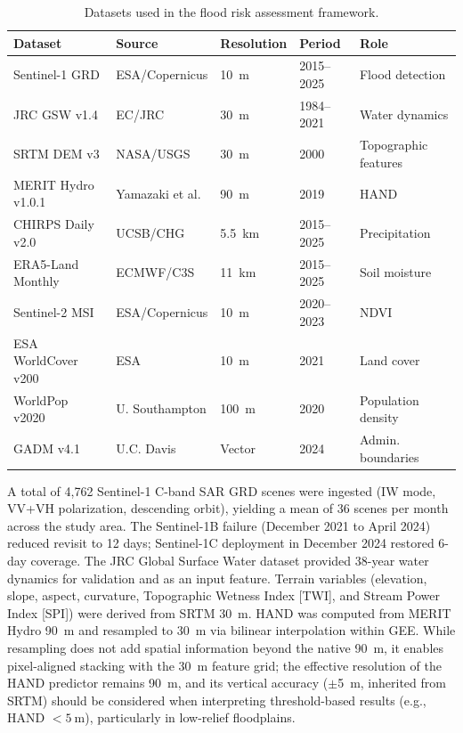 \documentclass{article}
\begin{document}
\begin{table}[htbp]
\caption{Datasets used in the flood risk assessment framework.}
\label{tab:data_sources}
\centering
\footnotesize
\begin{tabular}{lllll}
\toprule
\textbf{Dataset} & \textbf{Source} & \textbf{Resolution} & \textbf{Period} & \textbf{Role} \\
\midrule
Sentinel-1 GRD & ESA/Copernicus & \SI{10}{\metre} & 2015--2025 & Flood detection \\
JRC GSW v1.4 & EC/JRC & \SI{30}{\metre} & 1984--2021 & Water dynamics \\
SRTM DEM v3 & NASA/USGS & \SI{30}{\metre} & 2000 & Topographic features \\
MERIT Hydro v1.0.1 & Yamazaki et al. & \SI{90}{\metre} & 2019 & HAND \\
CHIRPS Daily v2.0 & UCSB/CHG & \SI{5.5}{\kilo\metre} & 2015--2025 & Precipitation \\
ERA5-Land Monthly & ECMWF/C3S & \SI{11}{\kilo\metre} & 2015--2025 & Soil moisture \\
Sentinel-2 MSI & ESA/Copernicus & \SI{10}{\metre} & 2020--2023 & NDVI \\
ESA WorldCover v200 & ESA & \SI{10}{\metre} & 2021 & Land cover \\
WorldPop v2020 & U. Southampton & \SI{100}{\metre} & 2020 & Population density \\
GADM v4.1 & U.C. Davis & Vector & 2024 & Admin. boundaries \\
\bottomrule
\end{tabular}
\end{table}

A total of 4,762 Sentinel-1 C-band SAR GRD scenes were ingested (IW mode, VV+VH polarization, descending orbit), yielding a mean of 36 scenes per month across the study area. The Sentinel-1B failure (December 2021 to April 2024) reduced revisit to 12 days; Sentinel-1C deployment in December 2024 restored 6-day coverage. The JRC Global Surface Water dataset \citep{Pekel2016} provided 38-year water dynamics for validation and as an input feature. Terrain variables (elevation, slope, aspect, curvature, Topographic Wetness Index [TWI], and Stream Power Index [SPI]) were derived from SRTM \SI{30}{\metre}. HAND was computed from MERIT Hydro \SI{90}{\metre} \citep{Yamazaki2019} and resampled to \SI{30}{\metre} via bilinear interpolation within GEE. While resampling does not add spatial information beyond the native \SI{90}{\metre}, it enables pixel-aligned stacking with the \SI{30}{\metre} feature grid; the effective resolution of the HAND predictor remains \SI{90}{\metre}, and its vertical accuracy ($\pm$\SI{5}{\metre}, inherited from SRTM) should be considered when interpreting threshold-based results (e.g., HAND $< \SI{5}{\metre}$), particularly in low-relief floodplains.
\end{document}
